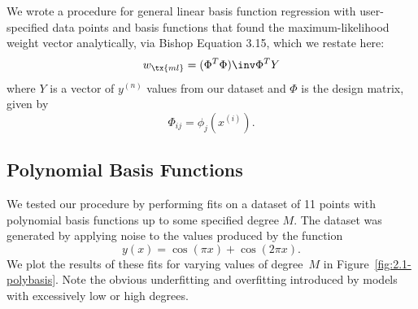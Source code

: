 \documentclass{article}
\begin{document}
\begin{multicols}{2}
We wrote a procedure for general linear basis function regression with user-specified data points and basis functions that found the maximum-likelihood weight vector analytically, via Bishop Equation 3.15, which we restate here:
\begin{equation}
\label{eq:max-likelihood-weights}
w_\tx{ml} = (\Phi^T\Phi)\inv\Phi^T Y
\end{equation}
where $Y$ is a vector of $y^{(n)}$ values from our dataset and $\Phi$ is the design matrix, given by
\begin{equation}
\Phi_{ij} = \phi_j(x^{(i)}).
\end{equation}

\subsection{Polynomial Basis Functions}

We tested our procedure by performing fits on a dataset of 11 points with polynomial basis functions up to some specified degree $M$.
The dataset was generated by applying noise to the values produced by the function
\begin{equation}
\label{eq:dataset-secret-func}
y(x) = \cos(\pi x) + \cos(2\pi x).
\end{equation}
We plot the results of these fits for varying values of degree~$M$ in Figure~\ref{fig:2.1-polybasis}.
Note the obvious underfitting and overfitting introduced by models with excessively low or high degrees.


\end{multicols}
\end{document}
